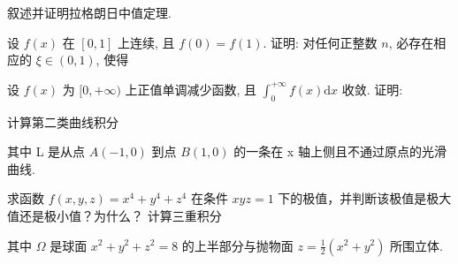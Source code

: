 叙述并证明拉格朗日中值定理.\par
\par{}
\par{}
设 $f(x)$ 在 $[0,1]$ 上连续, 且 $f(0) = f(1)$. 证明: 对任何正整数 $n$, 必存在相应的 $\xi \in (0,1)$, 使得\par
\nopagebreak[4]
\par{}
\par{}
设 $f(x)$ 为 $[0, +\infty)$ 上正值单调减少函数, 且 $\int_{0}^{+\infty} f(x) \mathrm{d}x$ 收敛. 证明:\par
\nopagebreak[4]
\par{}
\par{}
计算第二类曲线积分\par
\nopagebreak[4]
其中 L 是从点  $A(-1,0)$  到点  $B(1,0)$  的一条在 x 轴上侧且不通过原点的光滑曲线.\par
\par{}
\par{}
求函数 $f(x, y, z) = x^4 + y^4 + z^4$ 在条件 $xyz = 1$ 下的极值，并判断该极值是极大值还是极小值？为什么？
计算三重积分\par
\nopagebreak[4]
其中 $\Omega$ 是球面 $x^{2} + y^{2} + z^{2} = 8$ 的上半部分与抛物面 $z = \frac{1}{2} (x^2 +y^2)$ 所围立体.\par
